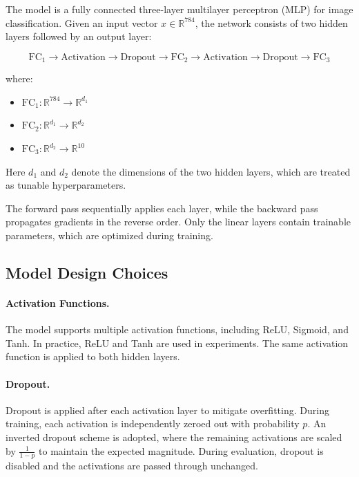 \documentclass[11pt]{article}
\begin{document}
The model is a fully connected three-layer multilayer perceptron (MLP) for image classification. Given an input vector $x \in \mathbb{R}^{784}$, the network consists of two hidden layers followed by an output layer:

\[
\text{FC}_1 \rightarrow \text{Activation} \rightarrow \text{Dropout} \rightarrow
\text{FC}_2 \rightarrow \text{Activation} \rightarrow \text{Dropout} \rightarrow
\text{FC}_3
\]

where:
\begin{itemize}
    \item $\text{FC}_1: \mathbb{R}^{784} \rightarrow \mathbb{R}^{d_1}$
    \item $\text{FC}_2: \mathbb{R}^{d_1} \rightarrow \mathbb{R}^{d_2}$
    \item $\text{FC}_3: \mathbb{R}^{d_2} \rightarrow \mathbb{R}^{10}$
\end{itemize}

Here $d_1$ and $d_2$ denote the dimensions of the two hidden layers, which are treated as tunable hyperparameters.

The forward pass sequentially applies each layer, while the backward pass propagates gradients in the reverse order. Only the linear layers contain trainable parameters, which are optimized during training.

\subsection{Model Design Choices}

\paragraph{Activation Functions.}
The model supports multiple activation functions, including ReLU, Sigmoid, and Tanh. In practice, ReLU and Tanh are used in experiments. The same activation function is applied to both hidden layers.

\paragraph{Dropout.}
Dropout is applied after each activation layer to mitigate overfitting. During training, each activation is independently zeroed out with probability $p$. An inverted dropout scheme is adopted, where the remaining activations are scaled by $\frac{1}{1-p}$ to maintain the expected magnitude. During evaluation, dropout is disabled and the activations are passed through unchanged.
\end{document}
